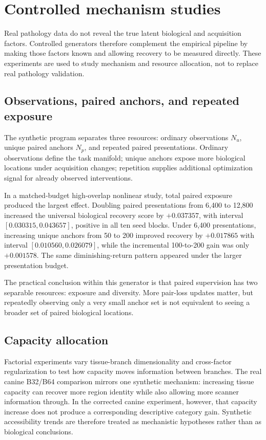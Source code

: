 \section{Controlled mechanism studies}

Real pathology data do not reveal the true latent biological and acquisition factors. Controlled generators therefore complement the empirical pipeline by making those factors known and allowing recovery to be measured directly. These experiments are used to study mechanism and resource allocation, not to replace real pathology validation.

\subsection{Observations, paired anchors, and repeated exposure}
The synthetic program separates three resources: ordinary observations $N_u$, unique paired anchors $N_p$, and repeated paired presentations. Ordinary observations define the task manifold; unique anchors expose more biological locations under acquisition changes; repetition supplies additional optimization signal for already observed interventions.

In a matched-budget high-overlap nonlinear study, total paired exposure produced the largest effect. Doubling paired presentations from 6,400 to 12,800 increased the universal biological recovery score by $+0.037357$, with interval $[0.030315,0.043657]$, positive in all ten seed blocks. Under 6,400 presentations, increasing unique anchors from 50 to 200 improved recovery by $+0.017865$ with interval $[0.010560,0.026079]$, while the incremental 100-to-200 gain was only $+0.001578$. The same diminishing-return pattern appeared under the larger presentation budget.

The practical conclusion within this generator is that paired supervision has two separable resources: exposure and diversity. More pair-loss updates matter, but repeatedly observing only a very small anchor set is not equivalent to seeing a broader set of paired biological locations.

\subsection{Capacity allocation}
Factorial experiments vary tissue-branch dimensionality and cross-factor regularization to test how capacity moves information between branches. The real canine B32/B64 comparison mirrors one synthetic mechanism: increasing tissue capacity can recover more region identity while also allowing more scanner information through. In the corrected canine experiment, however, that capacity increase does not produce a corresponding descriptive category gain. Synthetic accessibility trends are therefore treated as mechanistic hypotheses rather than as biological conclusions.

